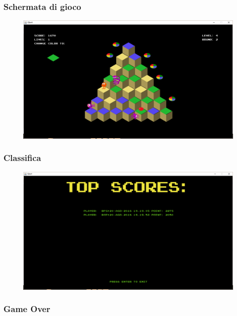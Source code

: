 \documentclass[a4paper,12pt, hidelinks]{report}
\begin{document}
\subsubsection{Schermata di gioco}

\begin{figure}[H]
\centering{}
\includegraphics[width=\linewidth]{img/Gameplay.png}
\label{img:Gameplay}
\end{figure}

\subsubsection{Classifica}

\begin{figure}[H]
\centering{}
\includegraphics[width=\linewidth]{img/Classifica.png}
\label{img:Classifica}
\end{figure}

\subsubsection{Game Over}
\end{document}
